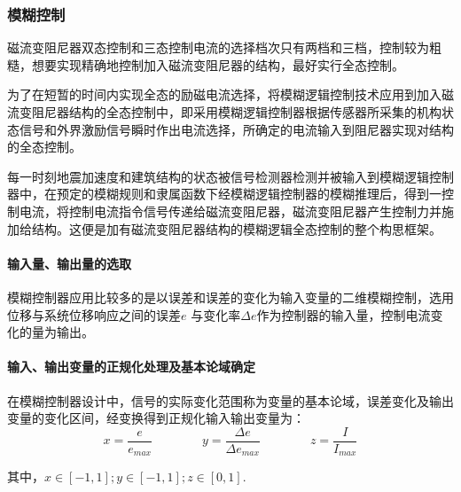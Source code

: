 

\subsubsection{模糊控制}
磁流变阻尼器双态控制和三态控制电流的选择档次只有两档和三档，控制较为粗糙，想要实现精确地控制加入磁流变阻尼器的结构，最好实行全态控制。

为了在短暂的时间内实现全态的励磁电流选择，将模糊逻辑控制技术应用到加入磁流变阻尼器结构的全态控制中，即采用模糊逻辑控制器根据传感器所采集的机构状态信号和外界激励信号瞬时作出电流选择，所确定的电流输入到阻尼器实现对结构的全态控制。

每一时刻地震加速度和建筑结构的状态被信号检测器检测并被输入到模糊逻辑控制器中，在预定的模糊规则和隶属函数下经模糊逻辑控制器的模糊推理后，得到一控制电流，将控制电流指令信号传递给磁流变阻尼器，磁流变阻尼器产生控制力并施加给结构。这便是加有磁流变阻尼器结构的模糊逻辑全态控制的整个构思框架。

\paragraph{输入量、输出量的选取}
\qquad 模糊控制器应用比较多的是以误差和误差的变化为输入变量的二维模糊控制，选用位移与系统位移响应之间的误差$e$ 与变化率$\Delta e$作为控制器的输入量，控制电流变化的量为输出。
\paragraph{输入、输出变量的正规化处理及基本论域确定}
\qquad 在模糊控制器设计中，信号的实际变化范围称为变量的基本论域，误差变化及输出变量的变化区间，经变换得到正规化输入输出变量为：
\[x=\frac{e}{e_{max}}\qquad \qquad y=\frac{\Delta e}{\Delta e_{max}}\qquad \qquad z=\frac{I}{I_{max}}\]

其中，$x\in [-1,1]; y\in [-1,1]; z\in [0,1]$.


